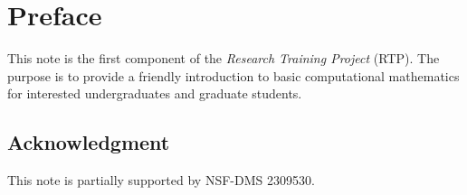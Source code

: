 \chapter*{Preface}

This note is the first component of the \emph{Research Training Project} (RTP).  The purpose is to provide a friendly introduction to basic computational mathematics for interested undergraduates and graduate students. 
\vspace{1cm}



\section*{Acknowledgment}
This note is partially supported by NSF-DMS 2309530.